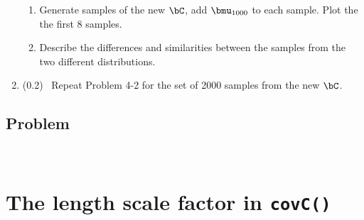 \documentclass[11pt,titlepage,fleqn]{article}
\begin{document}
\begin{enumerate}
\begin{enumerate}
\item Generate samples of the new $\bC$, add $\bmu_{1000}$ to each sample. Plot the the first 8 samples.

\item Describe the differences and similarities between the samples from the two different distributions.

\end{enumerate}


\item (0.2) \ptag\ Repeat Problem 4-2 for the set of 2000 samples from the new $\bC$.

\end{enumerate}


\subsection*{Problem} \howmuchtime\




\pagebreak

\appendix

\section{The length scale factor in {\tt covC()}}
\label{sec:matern}
\end{document}
